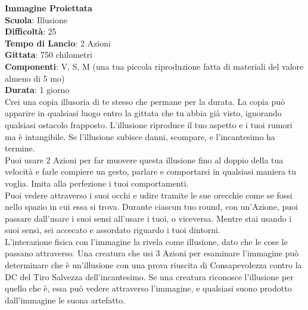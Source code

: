 \begin{multicols}{2}
\medskip\textbf{Immagine Proiettata}\\
\textbf{Scuola}: Illusione\\
\textbf{Difficoltà}: 25\\
\textbf{Tempo di Lancio}: 2 Azioni\\
\textbf{Gittata}: 750 chilometri\\
\textbf{Componenti}: V, S, M (una tua piccola riproduzione fatta di materiali del valore almeno di 5 mo)\\
\textbf{Durata}: 1 giorno\\
Crei una copia illusoria di te stesso che permane per la durata. La copia può apparire in qualsiasi luogo entro la gittata che tu abbia già visto, ignorando qualsiasi ostacolo frapposto. L'illusione riproduce il tuo aspetto e i tuoi rumori ma è intangibile. Se l'illusione subisce danni, scompare, e l'incantesimo ha termine.\\
Puoi usare 2 Azioni per far muovere questa illusione fino al doppio della tua velocità e farle compiere un gesto, parlare e comportarsi in qualsiasi maniera tu voglia. Imita alla perfezione i tuoi comportamenti.\\
Puoi vedere attraverso i suoi occhi e udire tramite le sue orecchie come se fossi nello spazio in cui essa si trova. Durante ciascun tuo round, con un'Azione, puoi passare dall'usare i suoi sensi all'usare i tuoi, o viceversa. Mentre stai usando i suoi sensi, sei accecato e assordato riguardo i tuoi dintorni.\\
L'interazione fisica con l'immagine la rivela come illusione, dato che le cose le passano attraverso. Una creatura che usi 3 Azioni per esaminare l'immagine può determinare che è un'illusione con una prova riuscita di Consapevolezza contro la DC del Tiro Salvezza dell'incantesimo. Se una creatura riconosce l'illusione per quello che è, essa può vedere attraverso l'immagine, e qualsiasi suono prodotto dall'immagine le suona artefatto.


\end{multicols}
